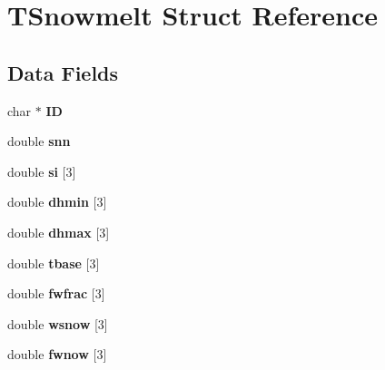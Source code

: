 \hypertarget{struct_t_snowmelt}{}\section{T\+Snowmelt Struct Reference}
\label{struct_t_snowmelt}
\subsection*{Data Fields}
\begin{DoxyCompactItemize}
\item 
\mbox{\label{struct_t_snowmelt_a63756a4a33a8c806e584babb52907653}} 
char $\ast$ {\bfseries ID}
\item 
\mbox{\label{struct_t_snowmelt_a4a30f30939683e64c6dba7e44002e8ff}} 
double {\bfseries snn}
\item 
\mbox{\label{struct_t_snowmelt_ace3eef629aa7d6496b8fbf541fc0eb1e}} 
double {\bfseries si} \mbox{[}3\mbox{]}
\item 
\mbox{\label{struct_t_snowmelt_aac502038ca2a0a8312ddfc1d46d7e7bd}} 
double {\bfseries dhmin} \mbox{[}3\mbox{]}
\item 
\mbox{\label{struct_t_snowmelt_a59c6d8ff74c8b8a7231b164b441a5d91}} 
double {\bfseries dhmax} \mbox{[}3\mbox{]}
\item 
\mbox{\label{struct_t_snowmelt_a40fb3cf45718c739dea8cb2fbc118969}} 
double {\bfseries tbase} \mbox{[}3\mbox{]}
\item 
\mbox{\label{struct_t_snowmelt_aa954866040af3494d8db1bf70c728030}} 
double {\bfseries fwfrac} \mbox{[}3\mbox{]}
\item 
\mbox{\label{struct_t_snowmelt_ae8c1afb272e19014de0866e6048b70c3}} 
double {\bfseries wsnow} \mbox{[}3\mbox{]}
\item 
\mbox{\label{struct_t_snowmelt_af403f46f69cb9042d4869032a8607287}} 
double {\bfseries fwnow} \mbox{[}3\mbox{]}
\item 
\mbox{\label{struct_t_snowmelt_a015db51963bfe15a1ddc1de2a78be20f}} 

\end{DoxyCompactItemize}
